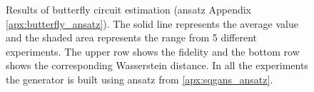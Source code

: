\begin{figure}[htbp!]
  \caption{Results of butterfly circuit estimation (ansatz Appendix \ref{apx:butterfly_ansatz}).
    The solid line represents the average value and the shaded area
    represents the range from 5 different experiments. The upper row shows the
    fidelity and the bottom row shows the corresponding Wasserstein distance. In all the
    experiments the generator is built using ansatz from \ref{apx:sqgans_ansatz}.}
  \label{fig:wqgans_res_butterfly_2}
\end{figure}

